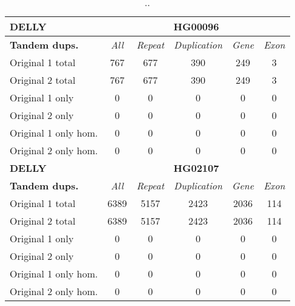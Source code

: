 \begin{table}[htb]
\begin{center}
\begin{tabular}{|l|c||c|c|c|c|}
\hline
{\bf DELLY} & \multicolumn{5}{|c|}{\bf HG00096} \\
\hline
\cline{2-6}
{\bf Tandem dups.} & {\it All} & {\it Repeat} & {\it Duplication} & {\it Gene} & {\it Exon} \\
\hline
Original 1 total & 767 & 677 & 390 & 249 & 3\\ 
\hline
Original 2 total & 767 & 677 & 390 & 249 & 3\\ 
\hline
Original 1 only & 0 & 0 & 0 & 0 & 0\\ 
\hline
Original 2 only & 0 & 0 & 0 & 0 & 0\\ 
\hline
Original 1 only hom. & 0 & 0 & 0 & 0 & 0\\ 
\hline
Original 2 only hom. & 0 & 0 & 0 & 0 & 0\\ 
\hline
\hline
{\bf DELLY} & \multicolumn{5}{|c|}{\bf HG02107} \\
\hline
\cline{2-6}
{\bf Tandem dups.} & {\it All} & {\it Repeat} & {\it Duplication} & {\it Gene} & {\it Exon} \\
\hline
Original 1 total & 6389 & 5157 & 2423 & 2036 & 114\\ 
\hline
Original 2 total & 6389 & 5157 & 2423 & 2036 & 114\\ 
\hline
Original 1 only & 0 & 0 & 0 & 0 & 0\\ 
\hline
Original 2 only & 0 & 0 & 0 & 0 & 0\\ 
\hline
Original 1 only hom. & 0 & 0 & 0 & 0 & 0\\ 
\hline
Original 2 only hom. & 0 & 0 & 0 & 0 & 0\\ 
\hline
\end{tabular}
\end{center}
\caption{ .. }
\label{tab:orig-vs-orig2-delly-dups}
\end{table}

